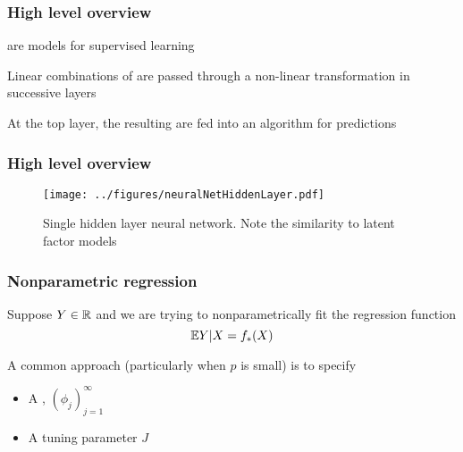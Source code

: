 \documentclass[12pt]{beamer}
\date{}
\begin{document}
\title{}
\subtitle{\classTitle}

\begin{frame}
\maketitle
%
\organization
%
\end{frame}


\begin{frame}[fragile]
\frametitle{High level overview}
 are models for supervised learning

\vsp
Linear combinations of  are passed through a non-linear transformation in successive layers

\vsp
At the top layer, the resulting  are fed into an algorithm for predictions

\end{frame}

\begin{frame}[fragile]
\frametitle{High level overview}
\begin{figure}
\centering
\texttt{[image: ../figures/neuralNetHiddenLayer.pdf]}
\caption{Single hidden layer neural network.  Note the similarity to latent factor models}
\end{figure}
\end{frame}

\begin{frame}[fragile]
\frametitle{Nonparametric regression}
Suppose $Y \in \mathbb{R}$ and we are trying to nonparametrically fit the regression function
\[
\mathbb{E} Y|X = f_*(X)
\]

\vsp
A common approach (particularly when $p$ is small) is to specify 
\begin{itemize}
\item A , $(\phi_j)_{j=1}^\infty$
\item A tuning parameter $J$
\end{itemize}
\end{frame}
\end{document}
